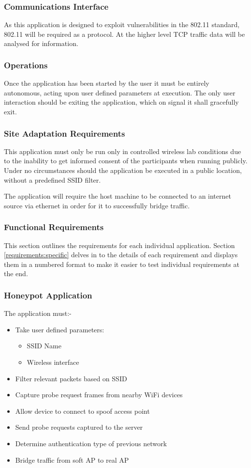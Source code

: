 \subsubsection{Communications Interface}
As this application is designed to exploit vulnerabilities in the 802.11 standard, 802.11 will be required as a protocol. At the higher level TCP traffic data will be analysed for information.

\subsubsection{Operations}
Once the application has been started by the user it must be entirely autonomous, acting upon user defined parameters at execution. The only user interaction should be exiting the application, which on signal it shall gracefully exit.

\subsubsection{Site Adaptation Requirements}
This application must only be run only in controlled wireless lab conditions due to the inability to get informed consent of the participants when running publicly. Under no circumstances should the application be executed in a public location, without a predefined SSID filter.

The application will require the host machine to be connected to an internet source via ethernet in order for it to successfully bridge traffic.

\newpage
\subsubsection{Functional Requirements}
This section outlines the requirements for each individual application. Section \ref{requirements:specific} delves in to the details of each requirement and displays them in a numbered format to make it easier to test individual requirements at the end.

\subsubsection*{Honeypot Application}
The application must:-
\begin{itemize}
	\item Take user defined parameters:
		\begin{itemize}
			\item SSID Name
			\item Wireless interface
		\end{itemize}
	\item Filter relevant packets based on SSID
	\item Capture probe request frames from nearby WiFi devices
	\item Allow device to connect to spoof access point
	\item Send probe requests captured to the server
	\item Determine authentication type of previous network
	\item Bridge traffic from soft AP to real AP
\end{itemize}

